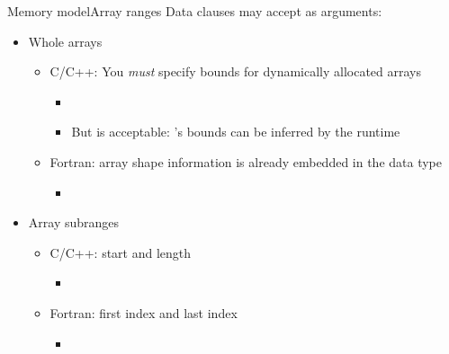 \documentclass[12pt,aspectratio=169]{beamer}
\begin{document}
\begin{frame}[fragile]{Memory model}{Array ranges}
  Data clauses may accept as arguments:
  \begin{itemize}
    \vfill
  \item Whole arrays
    \begin{itemize}
    \item C/C++: You \emph{must} specify bounds for dynamically allocated arrays
      \begin{itemize}
      \item {}
      \item But  is acceptable: 's bounds can be inferred by the runtime
      \end{itemize}
    \item Fortran: array shape information is already embedded in the data type
      \begin{itemize}
      \item {}
      \end{itemize}
    \end{itemize}
    \vfill
  \item Array subranges
    \begin{itemize}
    \item C/C++: start and length
      \begin{itemize}
      \item {}
      \end{itemize}
    \item Fortran: first index and last index
      \begin{itemize}
      \item {}
      \end{itemize}
    \end{itemize}
  \end{itemize}
\end{frame}
\end{document}

